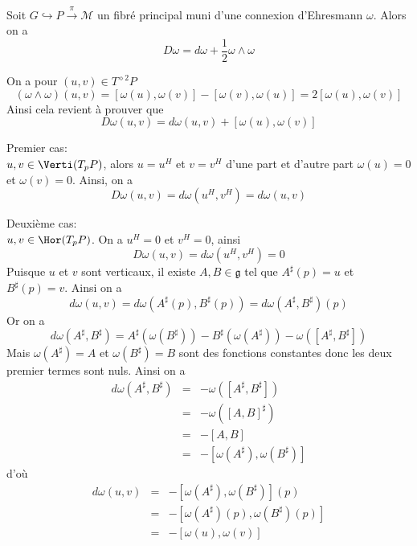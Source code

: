 \begin{pro}
Soit $G \hookrightarrow P \overset{\pi}{\to} \mathcal{M}$ un fibré principal muni d'une connexion d'Ehresmann $\omega$. Alors on a 
$$D\omega = d\omega + \frac{1}{2}\omega\wedge\omega$$
\end{pro}
\begin{preu}
On a pour $(u,v)\in T^{\diamond 2}P$
$$(\omega \wedge \omega) (u, v) = [\omega(u), \omega(v)] - [\omega(v), \omega(u)] = 2[\omega(u), \omega(v)]$$
Ainsi cela revient à prouver que 
$$D\omega(u, v) = d\omega(u, v) + [\omega(u), \omega(v)]$$

Premier cas: \\
$u,v\in \Verti(T_pP)$, alors $u = u^H$ et $v = v^H$ d'une part et d'autre part $\omega(u) = 0$ et $\omega(v) = 0$. Ainsi, on a
$$D\omega(u, v) = d\omega(u^H, v^H) = d\omega(u, v)$$

Deuxième cas:\\
$u, v \in \Hor(T_pP)$. On a $u^H = 0$ et $v^H = 0$, ainsi 
$$D\omega(u,v) = d\omega(u^H, v^H) = 0$$ 
Puisque $u$ et $v$ sont verticaux, il existe $A, B\in \mathfrak{g}$ tel que $A^\sharp(p) = u$ et $B^\sharp(p) = v$. Ainsi on a
$$d\omega(u, v) = d\omega(A^\sharp(p), B^\sharp(p)) = d\omega(A^\sharp, B^\sharp)(p)$$
Or on a 
$$d\omega(A^\sharp, B^\sharp) = A^\sharp(\omega(B^\sharp)) - B^\sharp(\omega(A^\sharp)) - \omega([A^\sharp, B^\sharp])$$
Mais $\omega(A^\sharp) = A$ et $\omega(B^\sharp) = B$ sont des fonctions constantes donc les deux premier termes sont nuls. Ainsi on a
\begin{eqnarray*}
d\omega(A^\sharp, B^\sharp) &=& -\omega([A^\sharp, B^\sharp]) \\
 & = & -\omega([A, B]^\sharp) \\
 & = & -[A,B] \\
 & = & -[\omega(A^\sharp), \omega(B^\sharp)]
\end{eqnarray*}
d'où
\begin{eqnarray*}
d\omega(u, v) &=& -[\omega(A^\sharp), \omega(B^\sharp)](p) \\
 & = & -[\omega(A^\sharp)(p), \omega(B^\sharp)(p)] \\
 & = & -[\omega(u), \omega(v)]
\end{eqnarray*}


\end{preu}
